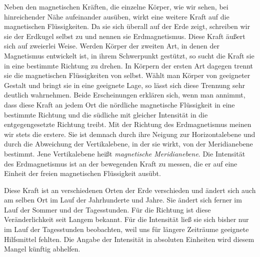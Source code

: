 Neben den magnetischen Kräften, die einzelne Körper, wie wir sehen, bei hinreichender Nähe aufeinander ausüben, wirkt eine weitere Kraft auf die magnetischen Flüssigkeiten. Da sie sich überall auf der Erde zeigt, schreiben wir sie der Erdkugel selbst zu und nennen sie Erdmagnetismus. Diese Kraft äußert sich auf zweierlei Weise. Werden Körper der zweiten Art, in denen der Magnetismus entwickelt ist, in ihrem Schwerpunkt gestützt, so sucht die Kraft sie in eine bestimmte Richtung zu drehen. In Körpern der ersten Art dagegen trennt sie die magnetischen Flüssigkeiten von selbst. Wählt man Körper von geeigneter Gestalt und bringt sie in eine geeignete Lage, so lässt sich diese Trennung sehr deutlich wahrnehmen. Beide Erscheinungen erklären sich, wenn man annimmt, dass diese Kraft an jedem Ort die nördliche magnetische Flüssigkeit in eine bestimmte Richtung und die südliche mit gleicher Intensität in die entgegengesetzte Richtung treibt. Mit der Richtung des Erdmagnetismus meinen wir stets die erstere. Sie ist demnach durch ihre Neigung zur Horizontalebene und durch die Abweichung der Vertikalebene, in der sie wirkt, von der Meridianebene bestimmt. Jene Vertikalebene heißt \textit{magnetische Meridianebene}. Die Intensität des Erdmagnetismus ist an der bewegenden Kraft zu messen, die er auf eine Einheit der freien magnetischen Flüssigkeit ausübt.

Diese Kraft ist an verschiedenen Orten der Erde verschieden und ändert sich auch am selben Ort im Lauf der Jahrhunderte und Jahre. Sie ändert sich ferner im Lauf der Sommer und der Tagesstunden. Für die Richtung ist diese Veränderlichkeit seit Langem bekannt. Für die Intensität ließ sie sich bisher nur im Lauf der Tagesstunden beobachten, weil uns für längere Zeiträume geeignete Hilfsmittel fehlten. Die Angabe der Intensität in absoluten Einheiten wird diesem Mangel künftig abhelfen.

